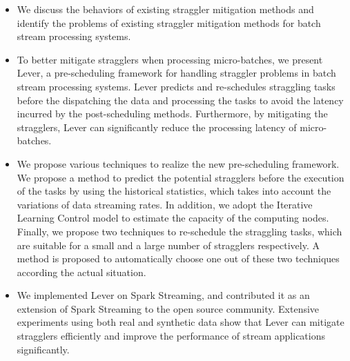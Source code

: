 \begin{itemize}
  \item We discuss the behaviors of existing straggler mitigation methods and
	identify the problems of existing straggler mitigation methods for batch
	stream processing systems.

  \item To better mitigate stragglers when processing micro-batches, we present
	Lever, a pre-scheduling framework for handling straggler problems in batch
	stream processing systems. Lever predicts and re-schedules straggling tasks 
	before the dispatching the data and processing the tasks to avoid the
	latency incurred by the post-scheduling methods. Furthermore, by mitigating
	the stragglers, Lever can significantly reduce the processing latency of
	micro-batches.

  \item We propose various techniques to realize the new pre-scheduling
	framework. We propose a method to predict the potential stragglers before the
	execution of the tasks by using the historical statistics, which takes into
	account the variations of data streaming rates. In addition, we adopt the
	Iterative Learning Control model to estimate the capacity of the computing
	nodes. Finally, we propose two techniques to re-schedule the straggling
	tasks, which are suitable for a small and a large number of stragglers
	respectively. A method is proposed to automatically choose one out of these
	two techniques according the actual situation.

  \item We implemented Lever on Spark Streaming, and contributed it as
	an extension of Spark Streaming to the open source community.  Extensive
	experiments using both real and synthetic data show that Lever can mitigate
	stragglers efficiently and improve the performance of stream applications
	significantly.  

\end{itemize}

